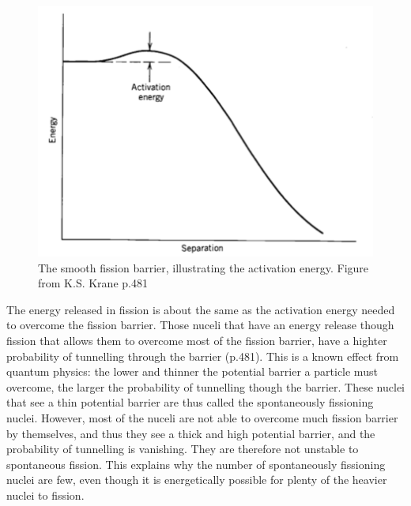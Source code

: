 \documentclass[]{article}
\begin{document}
 \begin{figure} [tbp]
 	\centering
 	\includegraphics[scale=0.7]{smooth_fission_barrier.png}
 	\caption{The smooth fission barrier, illustrating the activation energy. Figure from K.S. Krane p.481 \cite{Krane1988}}
 	\label{fig:smooth_fission_barrier}
 \end{figure}

\noindent The energy released in fission is about the same as the activation energy needed to overcome the fission barrier. Those nuceli that have an energy release though fission that allows them to overcome most of the fission barrier, have a highter probability of tunnelling through the barrier \cite{Krane1988} (p.481). This is a known effect from quantum physics: the lower and thinner the potential barrier a particle must overcome, the larger the probability of tunnelling though the barrier. These nuclei that see a thin potential barrier are thus called the spontaneously fissioning nuclei. However, most of the nuceli are not able to overcome much fission barrier by themselves, and thus they see a thick and high potential barrier, and the probability of tunnelling is vanishing. They are therefore not unstable to spontaneous fission. This explains why the number of spontaneously fissioning nuclei are few, even though it is energetically possible for plenty of the heavier nuclei to fission.
\end{document}
